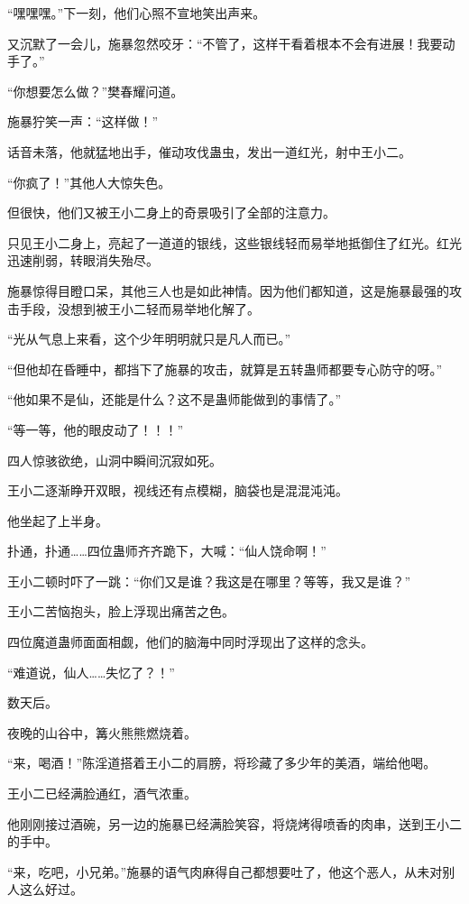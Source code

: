 \begin{this_body}
“嘿嘿嘿。”下一刻，他们心照不宣地笑出声来。

又沉默了一会儿，施暴忽然咬牙：“不管了，这样干看着根本不会有进展！我要动手了。”

“你想要怎么做？”樊春耀问道。

施暴狞笑一声：“这样做！”

话音未落，他就猛地出手，催动攻伐蛊虫，发出一道红光，射中王小二。

“你疯了！”其他人大惊失色。

但很快，他们又被王小二身上的奇景吸引了全部的注意力。

只见王小二身上，亮起了一道道的银线，这些银线轻而易举地抵御住了红光。红光迅速削弱，转眼消失殆尽。

施暴惊得目瞪口呆，其他三人也是如此神情。因为他们都知道，这是施暴最强的攻击手段，没想到被王小二轻而易举地化解了。

“光从气息上来看，这个少年明明就只是凡人而已。”

“但他却在昏睡中，都挡下了施暴的攻击，就算是五转蛊师都要专心防守的呀。”

“他如果不是仙，还能是什么？这不是蛊师能做到的事情了。”

“等一等，他的眼皮动了！！！”

四人惊骇欲绝，山洞中瞬间沉寂如死。

王小二逐渐睁开双眼，视线还有点模糊，脑袋也是混混沌沌。

他坐起了上半身。

扑通，扑通……四位蛊师齐齐跪下，大喊：“仙人饶命啊！”

王小二顿时吓了一跳：“你们又是谁？我这是在哪里？等等，我又是谁？”

王小二苦恼抱头，脸上浮现出痛苦之色。

四位魔道蛊师面面相觑，他们的脑海中同时浮现出了这样的念头。

“难道说，仙人……失忆了？！”

数天后。

夜晚的山谷中，篝火熊熊燃烧着。

“来，喝酒！”陈淫道搭着王小二的肩膀，将珍藏了多少年的美酒，端给他喝。

王小二已经满脸通红，酒气浓重。

他刚刚接过酒碗，另一边的施暴已经满脸笑容，将烧烤得喷香的肉串，送到王小二的手中。

“来，吃吧，小兄弟。”施暴的语气肉麻得自己都想要吐了，他这个恶人，从未对别人这么好过。


\end{this_body}
